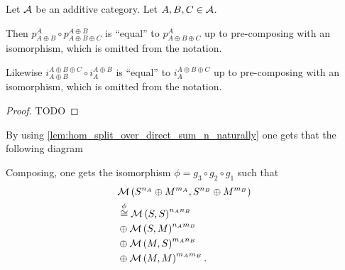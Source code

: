\begin{lemma} \label{lem:projection_unique}
    Let \( {\mathcal{A}} \) be an additive category. Let \( A, B, C \in {\mathcal{A}} \).

    Then \( p_{A \oplus B}^A \circ p_{A \oplus B \oplus C}^{A \oplus B} \) is ``equal'' to \( p_{A \oplus B \oplus C}^A \) up to pre-composing with an isomorphism, which is omitted from the notation.
    
    Likewise \( i_{A \oplus B}^{A \oplus B \oplus C} \circ i_A^{A \oplus B} \) is ``equal'' to \( i_A^{A \oplus B \oplus C} \) up to pre-composing with an isomorphism, which is omitted from the notation.
\end{lemma}
\begin{proof}
    TODO
\end{proof}

\begin{remark} \label{rem:big_iso}
    By using \autoref{lem:hom_split_over_direct_sum_n_naturally} one gets that the following diagram
    \begin{center}
    \end{center}
    
    
    Composing, one gets the isomorphism \( \phi = g_3 \circ g_2 \circ g_1 \) such that
    \begin{align*}
        &{\mathcal{M}}\left( S^{n_A} \oplus M^{m_A}, S^{n_B} \oplus M^{m_B} \right) \\
        &\stackrel{\phi}{\cong} {\mathcal{M}}\left(  S, S  \right)^{n_An_B} \\
        &\oplus {\mathcal{M}}\left(  S, M  \right)^{n_Am_B} \\
        &\oplus {\mathcal{M}}\left(  M, S  \right)^{m_An_B} \\
        &\oplus {\mathcal{M}}\left(  M, M  \right)^{m_Am_B}.
    \end{align*}


\end{remark}
